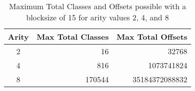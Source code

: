 \begin{table}[h]
\begin{center}
\begin{tabular}{crr}
\toprule
Arity & \multicolumn{1}{c}{Max Total Classes} &
\multicolumn{1}{c}{Max Total Offsets}\\
\midrule
2 & 16 & 32768\\
4 & 816 & 1073741824\\
8 & 170544 & 35184372088832\\
\bottomrule
\end{tabular}
\caption{Maximum Total Classes and Offsets possible with a blocksize of 15 for arity 
    values 2, 4, and 8}
\label{tab:maxclass}
\end{center}
\end{table}
